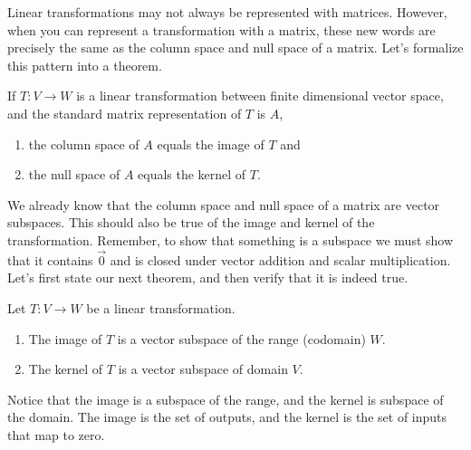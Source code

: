 Linear transformations may not always be represented with matrices. However, when you can represent a transformation with a matrix, these new words are precisely the same as the column space and null space of a matrix.  Let's formalize this pattern into a theorem.
\begin{theorem}
If $T:V\to W$ is a linear transformation between finite dimensional vector space, and the standard matrix representation of $T$ is $A$, 
\begin{enumerate}
	\item the column space of $A$ equals the image of $T$ and 
	\item the null space of $A$ equals the kernel of $T$.
\end{enumerate}
\end{theorem}

We already know that the column space and null space of a matrix are vector subspaces.  This should also be true of the image and kernel of the transformation. Remember, to show that something is a subspace we must show that it contains $\vec 0$ and is closed under vector addition and scalar multiplication.  Let's first state our next theorem, and then verify that it is indeed true. 

\begin{theorem}
Let $T:V\to W$ be a linear transformation. 
\begin{enumerate}
	\item The image of $T$ is a vector subspace of the range (codomain) $W$. 
	\item The kernel of $T$ is a vector subspace of domain $V$.
\end{enumerate}
\end{theorem}
Notice that the image is a subspace of the range, and the kernel is  subspace of the domain. The image is the set of outputs, and the kernel is the set of inputs that map to zero. 

